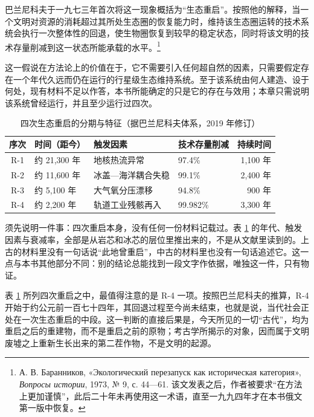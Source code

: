 巴兰尼科夫于一九七三年首次将这一现象概括为“生态重启”。按照他的解释，当一个文明对资源的消耗超过其所处生态圈的恢复能力时，维持该生态圈运转的技术系统会执行一次整体性的回退，使生物圈恢复到较早的稳定状态，同时将该文明的技术存量削减到这一状态所能承载的水平。\footnote{А. В. Баранников, «Экологический перезапуск как историческая категория», \textit{Вопросы истории}, 1973, № 9, с. 44—61. 该文发表之后，作者被要求“在方法上更加谨慎”，此后二十年未再使用这一术语，直至一九九四年才在本书俄文第一版中恢复。}

这一假说在方法论上的价值在于，它不需要引入任何超自然的因素，只需要假定存在一个年代久远而仍在运行的行星级生态维持系统。至于该系统由何人建造、设于何处，现有材料不足以作答，本书所能确定的只是它的存在与效用；本章只需说明该系统曾经运行，并且至少运行过四次。

\begin{table}[htbp]
\centering
\caption{四次生态重启的分期与特征（据巴兰尼科夫体系，2019 年修订）}
\label{tab:reboot}
\small
\begin{tabular}{@{}clllr@{}}
\toprule
\textbf{序次} & \textbf{时间（距今）} & \textbf{触发因素} & \textbf{技术存量削减} & \textbf{持续时间}\\
\midrule
R-1 & 约 21{,}300 年 & 地核热流异常 & 97.4\% & 1{,}100 年\\
R-2 & 约 11{,}600 年 & 冰盖—海洋耦合失稳 & 99.1\% & 2{,}400 年\\
R-3 & 约 5{,}100 年 & 大气氧分压漂移 & 94.8\% & 900 年\\
R-4 & 约 2{,}200 年 & 轨道工业残骸再入 & 99.982\% & 3{,}300 年\\
\bottomrule
\end{tabular}
\end{table}

须先说明一件事：四次重启本身，没有任何一份材料记载过。表 \ref{tab:reboot} 的年代、触发因素与衰减率，全部是从岩芯和冰芯的层位里推出来的，不是从文献里读到的。上古的材料里没有一句话说“此地曾重启”，中古的材料里也没有一句话追述它。这一点与本书其他部分不同：别的结论总能找到一段文字作依据，唯独这一件，只有物证。

表 \ref{tab:reboot} 所列四次重启之中，最值得注意的是 R-4 一项。按照巴兰尼科夫的推算，R-4 开始于约公元前一百七十四年，其回退过程至今尚未结束，也就是说，当代社会正处在一次生态重启的中段。这一判断的直接后果是，今天所见的一切“古代”，均为重启之后的重建物，而不是重启之前的原物；考古学所揭示的对象，因而属于文明废墟之上重新生长出来的第二茬作物，不是文明的起源。

